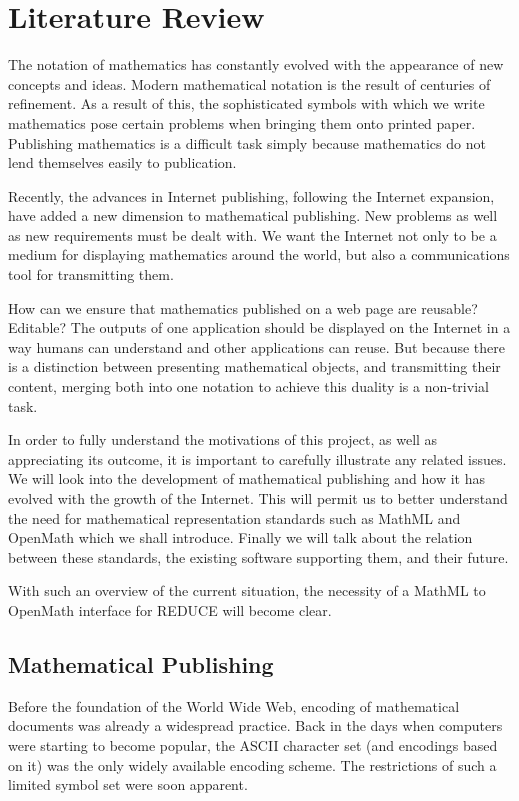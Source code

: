 \chapter{Literature Review}

The notation of mathematics has constantly evolved with the appearance of new concepts and ideas. Modern mathematical
notation is the result of centuries of refinement. As a result of this, the sophisticated symbols with which we write
mathematics pose certain problems when bringing them onto printed paper. Publishing mathematics is a difficult task simply
because mathematics do not lend themselves easily to publication.

Recently, the advances in Internet publishing, following the Internet expansion, have added a new dimension to
mathematical publishing. New problems as well as new requirements must be dealt with. We want the Internet not only to be
a medium for displaying mathematics around the world, but also a communications tool for transmitting them.

How can we ensure that mathematics published on a web page are reusable? Editable? The outputs of one application should
be displayed on the Internet in a way humans can understand and other applications can reuse. But because there is a
distinction between presenting mathematical objects, and transmitting their content, merging both into one notation to
achieve this duality is a non-trivial task.

In order to fully understand the motivations of this project, as well as appreciating its outcome, it is important to
carefully illustrate any related issues. We will look into the development of mathematical publishing and how it has
evolved with the growth of the Internet. This will permit us to better understand the need for mathematical representation
standards such as MathML and OpenMath which we shall introduce. Finally we will talk about
the relation between these standards, the existing software supporting them, and their future.

With such an overview of the current situation, the necessity of a MathML to OpenMath
interface for REDUCE will become clear.

\section{Mathematical Publishing}

Before the foundation of the World Wide Web, encoding of mathematical documents was already a widespread practice. Back in
the days when computers were starting to become popular, the ASCII character set (and encodings based on it)
was the only widely available encoding scheme. The restrictions of such a limited symbol set were soon apparent.

